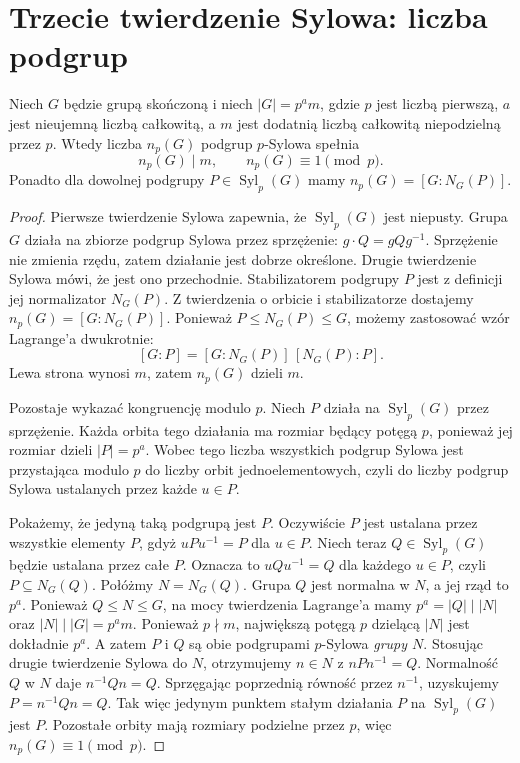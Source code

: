 \section{Trzecie twierdzenie Sylowa: liczba podgrup}
\begin{twierdzenie}
\label{aa:tw:sylow3}
Niech $G$ będzie grupą skończoną i niech
$|G|=p^a m$, gdzie $p$ jest liczbą pierwszą,
$a$ jest nieujemną liczbą całkowitą, a $m$ jest dodatnią
liczbą całkowitą niepodzielną przez $p$.
Wtedy liczba $n_p(G)$ podgrup $p$-Sylowa spełnia
\[
 n_p(G)\mid m,\qquad n_p(G)\equiv1\pmod p.
\]
Ponadto dla dowolnej podgrupy $P\in\operatorname{Syl}_p(G)$
mamy $n_p(G)=[G:N_G(P)]$.
\end{twierdzenie}
\begin{proof}
Pierwsze twierdzenie Sylowa zapewnia, że
$\operatorname{Syl}_p(G)$ jest niepusty.
Grupa $G$ działa na zbiorze podgrup Sylowa przez sprzężenie:
$g\cdot Q=gQg^{-1}$. Sprzężenie nie zmienia rzędu,
zatem działanie jest dobrze określone.
Drugie twierdzenie Sylowa mówi, że jest ono przechodnie.
Stabilizatorem podgrupy $P$ jest z definicji jej normalizator
$N_G(P)$. Z twierdzenia o orbicie i stabilizatorze dostajemy
$n_p(G)=[G:N_G(P)]$.
Ponieważ $P\le N_G(P)\le G$, możemy zastosować
wzór Lagrange'a dwukrotnie:
\[
 [G:P]=[G:N_G(P)]\,[N_G(P):P].
\]
Lewa strona wynosi $m$, zatem $n_p(G)$ dzieli $m$.

Pozostaje wykazać kongruencję modulo $p$.
Niech $P$ działa na $\operatorname{Syl}_p(G)$
przez sprzężenie. Każda orbita tego działania ma
rozmiar będący potęgą $p$, ponieważ jej rozmiar dzieli
$|P|=p^a$. Wobec tego liczba wszystkich podgrup Sylowa
jest przystająca modulo $p$ do liczby orbit jednoelementowych,
czyli do liczby podgrup Sylowa ustalanych przez każde $u\in P$.

Pokażemy, że jedyną taką podgrupą jest $P$.
Oczywiście $P$ jest ustalana przez wszystkie elementy $P$,
gdyż $uPu^{-1}=P$ dla $u\in P$.
Niech teraz $Q\in\operatorname{Syl}_p(G)$ będzie ustalana
przez całe $P$. Oznacza to $uQu^{-1}=Q$ dla każdego $u\in P$,
czyli $P\subseteq N_G(Q)$.
Połóżmy $N=N_G(Q)$. Grupa $Q$ jest normalna w $N$,
a jej rząd to $p^a$.
Ponieważ $Q\le N\le G$, na mocy twierdzenia Lagrange'a
mamy $p^a=|Q|\mid|N|$ oraz $|N|\mid|G|=p^a m$.
Ponieważ $p\nmid m$, największą potęgą $p$ dzielącą
$|N|$ jest dokładnie $p^a$.
A zatem $P$ i $Q$ są obie podgrupami $p$-Sylowa \emph{grupy $N$}.
Stosując drugie twierdzenie Sylowa do $N$, otrzymujemy
$n\in N$ z $nPn^{-1}=Q$.
Normalność $Q$ w $N$ daje $n^{-1}Qn=Q$.
Sprzęgając poprzednią równość przez $n^{-1}$,
uzyskujemy $P=n^{-1}Qn=Q$.
Tak więc jedynym punktem stałym działania $P$
na $\operatorname{Syl}_p(G)$ jest $P$.
Pozostałe orbity mają rozmiary podzielne przez $p$,
więc $n_p(G)\equiv1\pmod p$.
\end{proof}

